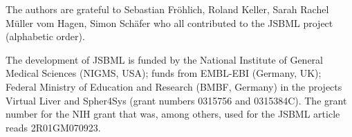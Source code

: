 The authors are grateful to Sebastian Fr\"ohlich, Roland Keller, Sarah
Rachel M\"uller vom Hagen, Simon Sch\"afer who all contributed to the JSBML
project (alphabetic order).

The development of JSBML is funded by the National Institute of General Medical
Sciences (NIGMS, USA); funds from EMBL-EBI (Germany, UK); Federal Ministry of
Education and Research (BMBF, Germany) in the projects Virtual Liver and
Spher4Sys (grant numbers 0315756 and 0315384C). The grant number for the NIH
grant that was, among others, used for the JSBML article reads 2R01GM070923.
